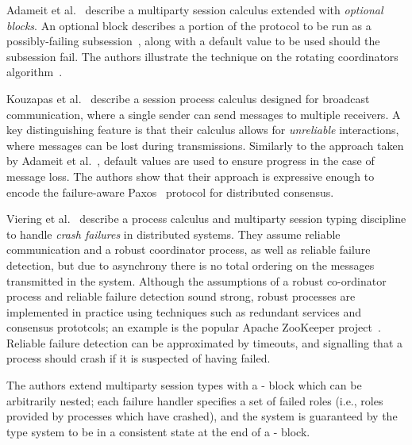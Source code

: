 \documentclass[
graybox,
envcountchap
]{svmult}
\begin{document}
\begin{bibunit}
  Adameit et al.~\cite{AdameitPN17:link-failures} describe a multiparty session
  calculus extended with \emph{optional blocks}. An optional block describes a
  portion of the protocol to be run as a possibly-failing
  subsession~\cite{DemangeonH12:subsessions}, along with a default value to be
  used should the subsession fail. The authors illustrate the technique on the
  rotating coordinators algorithm~\cite{Tel00:dist-algorithms}.

  Kouzapas et al.~\cite{KouzapasGVG19:async-broadcast} describe a session
  process calculus designed for broadcast communication, where a single sender
  can send messages to multiple receivers. A key distinguishing feature is that
  their calculus allows for \emph{unreliable} interactions, where messages can
  be lost during transmissions. Similarly to the approach taken by Adameit et
  al.~\cite{AdameitPN17:link-failures}, default values are used to ensure
  progress in the case of message loss.  The authors show that their approach is
  expressive enough to encode the failure-aware Paxos~\cite{Lamport98:paxos}
  protocol for distributed consensus.

  Viering et al.~\cite{VieringCEHZ18:crash-handling} describe a process calculus
  and multiparty session typing discipline to handle \emph{crash failures} in
  distributed systems. They assume reliable communication and a robust
  coordinator process, as well as reliable failure detection, but due to
  asynchrony there is no total ordering on the messages transmitted in the
  system.
%
  Although the assumptions of a robust co-ordinator process and reliable failure
  detection sound strong, robust processes are implemented in practice using
  techniques such as redundant services and consensus prototcols; an example is
  the popular Apache ZooKeeper project~\cite{JunqueiraR13:zookeeper}. Reliable
  failure detection can be approximated by timeouts, and signalling that a
  process should crash if it is suspected of having failed.

  The authors extend multiparty session types with a
  - block which can be arbitrarily nested; each failure
  handler specifies a set of failed roles (i.e., roles provided by processes
  which have crashed), and the system is guaranteed by the type system to be in
  a consistent state at the end of a - block.


\end{bibunit}
\end{document}
